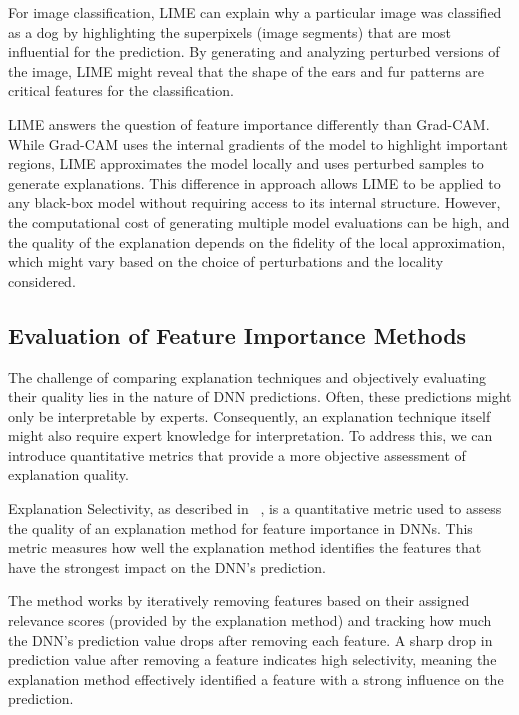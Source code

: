 \documentclass{article}
\begin{document}
For image classification, LIME can explain why a particular image was classified as a dog by highlighting the superpixels (image segments) that are most influential for the prediction. By generating and analyzing perturbed versions of the image, LIME might reveal that the shape of the ears and fur patterns are critical features for the classification.

LIME answers the question of feature importance differently than Grad-CAM. While Grad-CAM uses the internal gradients of the model to highlight important regions, LIME approximates the model locally and uses perturbed samples to generate explanations. This difference in approach allows LIME to be applied to any black-box model without requiring access to its internal structure. However, the computational cost of generating multiple model evaluations can be high, and the quality of the explanation depends on the fidelity of the local approximation, which might vary based on the choice of perturbations and the locality considered.



\subsection{Evaluation of Feature Importance Methods}
The challenge of comparing explanation techniques and objectively evaluating their quality lies in the nature of DNN predictions. Often, these predictions might only be interpretable by experts. Consequently, an explanation technique itself might also require expert knowledge for interpretation. To address this, we can introduce quantitative metrics that provide a more objective assessment of explanation quality.

Explanation Selectivity, as described in ~\cite{MONTAVON20181}, is a quantitative metric used to assess the quality of an explanation method for feature importance in DNNs. This metric measures how well the explanation method identifies the features that have the strongest impact on the DNN’s prediction.

The method works by iteratively removing features based on their assigned relevance scores (provided by the explanation method) and tracking how much the DNN’s prediction value drops after removing each feature. A sharp drop in prediction value after removing a feature indicates high selectivity, meaning the explanation method effectively identified a feature with a strong influence on the prediction.
\end{document}
